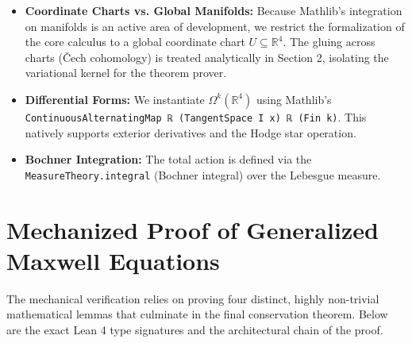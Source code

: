 \documentclass[11pt, a4paper]{article}
\begin{document}
\begin{itemize}
    \item \textbf{Coordinate Charts vs. Global Manifolds:} Because Mathlib's integration on manifolds is an active area of development, we restrict the formalization of the core calculus to a global coordinate chart $U \subseteq \mathbb{R}^4$. The gluing across charts (\v{C}ech cohomology) is treated analytically in Section 2, isolating the variational kernel for the theorem prover.
    \item \textbf{Differential Forms:} We instantiate $\Omega^k(\mathbb{R}^4)$ using Mathlib's \texttt{ContinuousAlternatingMap ℝ (TangentSpace I x) ℝ (Fin k)}. This natively supports exterior derivatives and the Hodge star operation.
    \item \textbf{Bochner Integration:} The total action is defined via the \texttt{MeasureTheory.integral} (Bochner integral) over the Lebesgue measure.
\end{itemize}

\section{Mechanized Proof of Generalized Maxwell Equations}
The mechanical verification relies on proving four distinct, highly non-trivial mathematical lemmas that culminate in the final conservation theorem. Below are the exact Lean 4 type signatures and the architectural chain of the proof.
\end{document}

